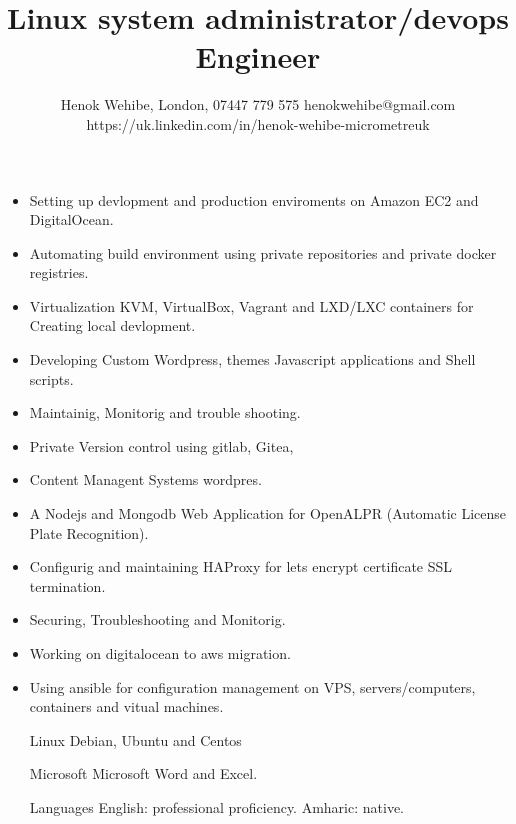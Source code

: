 \documentclass{article}
\title{Linux system administrator/devops Engineer}
\author{Henok Wehibe, London,  07447 779 575 henokwehibe@gmail.com https://uk.linkedin.com/in/henok-wehibe-micrometreuk}
\begin{document}
\maketitle %


\begin{itemize}
\item Setting up devlopment and production enviroments on Amazon EC2  and DigitalOcean.
\item Automating build environment using private repositories and private docker registries.
\item Virtualization  KVM, VirtualBox, Vagrant and LXD/LXC containers for Creating local devlopment.
\item Developing  Custom Wordpress, themes Javascript applications and Shell scripts. 
\item Maintainig, Monitorig and trouble shooting.
\item Private Version control using gitlab, Gitea, 
\item Content Managent Systems wordpres. 
\item A Nodejs and Mongodb Web Application for OpenALPR (Automatic License Plate Recognition).
\item Configurig and maintaining  HAProxy for lets encrypt certificate SSL termination.
\item Securing, Troubleshooting and Monitorig.
\item Working on digitalocean to aws migration.
\item Using ansible for configuration management on VPS, servers/computers,  containers and vitual machines.
\item [Linux]Debian, Ubuntu and Centos
\item[Microsoft]Microsoft Word and Excel.
\item[Languages]English: professional proficiency.  Amharic: native.
\end{itemize}
\end{document}
